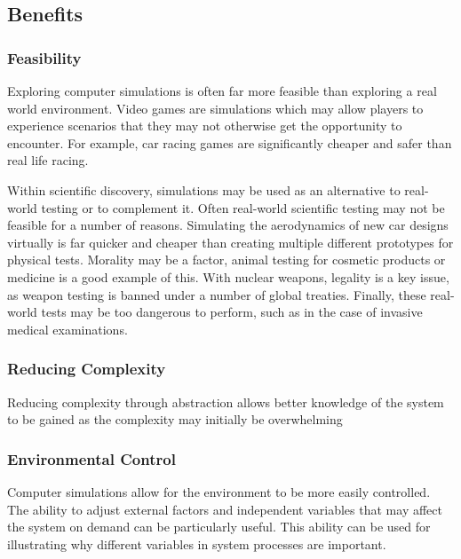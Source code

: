 \documentclass{UoYCSproject}
\begin{document}
\subsection{Benefits}
\subsubsection{Feasibility}
Exploring computer simulations is often far more feasible than exploring a real world environment. Video games are simulations which may allow players to experience scenarios that they may not otherwise get the opportunity to encounter. For example, car racing games are significantly cheaper and safer than real life racing.

Within scientific discovery, simulations may be used as an alternative to real-world testing or to complement it. Often real-world scientific testing may not be feasible for a number of reasons. Simulating the aerodynamics of new car designs virtually is far quicker and cheaper than creating multiple different prototypes for physical tests. Morality may be a factor, animal testing for cosmetic products or medicine is a good example of this. With nuclear weapons, legality is a key issue, as weapon testing is banned under a number of global treaties. Finally, these real-world tests may be too dangerous to perform, such as in the case of invasive medical examinations.




\subsubsection{Reducing Complexity}
Reducing complexity through abstraction allows better knowledge of the system to be gained as the complexity may initially be overwhelming

\subsubsection{Environmental Control}
Computer simulations allow for the environment to be more easily controlled. The ability to adjust external factors and independent variables that may affect the system on demand can be particularly useful. This ability can be used for illustrating why different variables in system processes are important.
\end{document}
